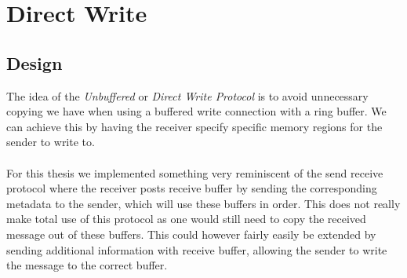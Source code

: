 \section{Direct Write}\label{sec:conn:direct_write}

\subsection{Design} \label{sendrcv-design}
The idea of the \emph{Unbuffered} or \emph{Direct Write Protocol} is to avoid unnecessary copying we have when using
a buffered write connection with a ring buffer. We can achieve this by having the receiver specify specific memory 
regions for the sender to write to. 

\paragraph{} For this thesis we implemented something very reminiscent of the send receive protocol where the receiver 
posts receive buffer by sending the corresponding metadata to the sender, which will use these buffers in order. This does
not really make total use of this protocol as one would still need to copy the received message out of these buffers. This
could however fairly easily be extended by sending additional information with receive buffer, allowing the sender to write
the message to the correct buffer.


